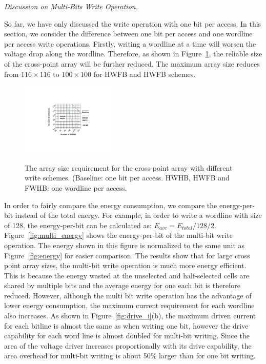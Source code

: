\vspace{6pt} \emph{Discussion on Multi-Bits Write Operation.} \vspace{6pt}

So far, we have only discussed the write operation with one bit per access. In this section, we consider the difference between one bit per access and one wordline per access write operations. Firstly, writing a wordline at a time will worsen the voltage drop along the wordline. Therefore, as shown in Figure~\ref{fig:reliable_region}, the reliable size of the cross-point array will be further reduced. The maximum array size reduces from $116{\times}116$ to $100{\times}100$ for HWFB and HWFB schemes.


\begin{figure}%
\centering
  \includegraphics[width=0.4\textwidth]{./figures/multiwrite_f.pdf}\\
  \caption{The array size requirement for the cross-point array with different write schemes. (Baseline: one bit per access. HWHB, HWFB and FWHB: one wordline per access. }\label{fig:reliable_region}
    \vspace{-10pt}
\end{figure}

In order to fairly compare the energy consumption, we compare the energy-per-bit instead of the total energy. For example, in order to write a wordline with size of 128, the energy-per-bit can be calculated as:
$E_{ave}=E_{total}/128/2$. Figure~\ref{fig:multi_energy} shows the energy-per-bit of the multi-bit write operation. The energy shown in this figure is normalized to the same unit as Figure~\ref{fig:energy} for easier comparison. The results show that for large cross point array sizes, the multi-bit write operation is much more energy efficient. This is because the energy wasted at the unselected and half-selected cells are shared by multiple bits and the average energy for one each bit is therefore reduced. However, although the multi bit write operation has the advantage of lower energy consumption, the maximum current requirement for each wordline also increases. As shown in Figure~\ref{fig:drive_i}(b), the maximum driven current for each bitline is almost the same as when writing one bit, however the drive capability for each word line is almost doubled for multi-bit writing. Since the area of the voltage driver increases proportionally with its drive capability, the area overhead for multi-bit writing is about 50\% larger than for one bit writing.

